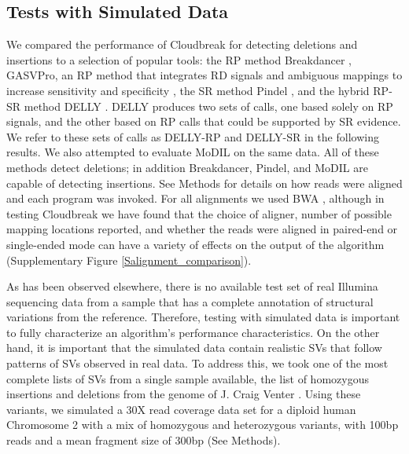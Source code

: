 \documentclass[11pt]{article}
\begin{document}
\subsection{Tests with Simulated Data}

We compared the performance of Cloudbreak for detecting deletions and insertions to a selection of popular tools: the RP method Breakdancer \autocite{Chen:2009p3}, GASVPro, an RP method that integrates RD signals and ambiguous mappings to increase sensitivity and specificity \autocite{Sindi:2012kk}, the SR method Pindel \autocite{Ye:2009p2}, and the hybrid RP-SR method DELLY \autocite{Rausch:2012he}. DELLY produces two sets of calls, one based solely on RP signals, and the other based on RP calls that could be supported by SR evidence. We refer to these sets of calls as DELLY-RP and DELLY-SR in the following results. We also attempted to evaluate MoDIL on the same data. All of these methods detect deletions; in addition Breakdancer, Pindel, and MoDIL are capable of detecting insertions. See Methods for details on how reads were aligned and each program was invoked. For all alignments we used BWA \autocite{Li:2009p836}, although in testing Cloudbreak we have found that the choice of aligner, number of possible mapping locations reported, and whether the reads were aligned in paired-end or single-ended mode can have a variety of effects on the output of the algorithm (Supplementary Figure \ref{Salignment_comparison}).

As has been observed elsewhere, there is no available test set of real Illumina sequencing data from a sample that has a complete annotation of structural variations from the reference. Therefore, testing with simulated data is important to fully characterize an algorithm's performance characteristics. On the other hand, it is important that the simulated data contain realistic SVs that follow patterns of SVs observed in real data. To address this, we took one of the most complete lists of SVs from a single sample available, the list of homozygous insertions and deletions from the genome of J. Craig Venter \autocite{Levy:2007fb}. Using these variants, we simulated a 30X read coverage data set for a diploid human Chromosome 2 with a mix of homozygous and heterozygous variants, with 100bp reads and a mean fragment size of 300bp (See Methods).
\end{document}
